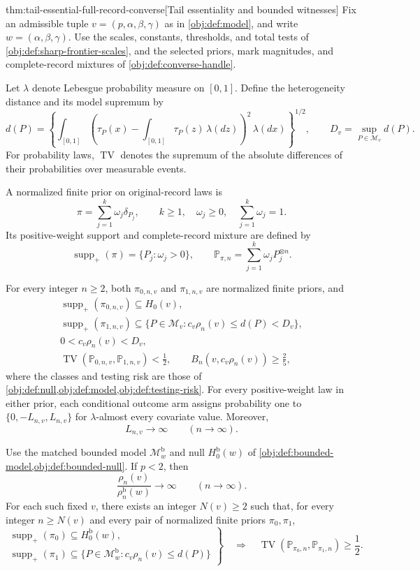 \begin{theoremv}{thm:tail-essential-full-record-converse}[Tail essentiality and bounded witnesses]
Fix an admissible tuple \(v=(p,\alpha,\beta,\gamma)\) as in \cref{obj:def:model}, and write \(w=(\alpha,\beta,\gamma)\). Use the scales, constants, thresholds, and total tests of \cref{obj:def:sharp-frontier-scales}, and the selected priors, mark magnitudes, and complete-record mixtures of \cref{obj:def:converse-handle}.

Let \(\lambda\) denote Lebesgue probability measure on \([0,1]\). Define the heterogeneity distance and its model supremum by
\[
d(P)=
\left\{\int_{[0,1]}
\left(\tau_P(x)-\int_{[0,1]}\tau_P(z)\,\lambda(dz)\right)^2
\,\lambda(dx)\right\}^{1/2},
\qquad
D_v=\sup_{P\in\mathcal M_v}d(P).
\]
For probability laws, \(\operatorname{TV}\) denotes the supremum of the absolute differences of their probabilities over measurable events.

A normalized finite prior on original-record laws is
\[
\pi=\sum_{j=1}^{k}\omega_j\delta_{P_j},
\qquad
k\ge1,\quad \omega_j\ge0,\quad \sum_{j=1}^{k}\omega_j=1.
\]
Its positive-weight support and complete-record mixture are defined by
\[
\operatorname{supp}_+(\pi)=\{P_j:\omega_j>0\},
\qquad
\mathbb P_{\pi,n}=\sum_{j=1}^{k}\omega_jP_j^{\otimes n}.
\]

For every integer \(n\ge2\), both \(\pi_{0,n,v}\) and \(\pi_{1,n,v}\) are normalized finite priors, and
\[
\begin{gathered}
\operatorname{supp}_+(\pi_{0,n,v})\subseteq H_0(v),\\
\operatorname{supp}_+(\pi_{1,n,v})
\subseteq
\{P\in\mathcal M_v:c_v\rho_n(v)\le d(P)<D_v\},\\
0<c_v\rho_n(v)<D_v,\\
\operatorname{TV}(\mathbb P_{0,n,v},\mathbb P_{1,n,v})<\frac12,
\qquad
B_n(v,c_v\rho_n(v))\ge\frac25,
\end{gathered}
\]
where the classes and testing risk are those of
\cref{obj:def:null,obj:def:model,obj:def:testing-risk}.
For every positive-weight law in either prior, each conditional outcome arm assigns probability one to
\(\{0,-L_{n,v},L_{n,v}\}\) for \(\lambda\)-almost every covariate value. Moreover,
\[
L_{n,v}\longrightarrow\infty
\qquad(n\longrightarrow\infty).
\]

Use the matched bounded model \(\mathcal M^{\mathrm b}_w\) and null
\(H_0^{\mathrm b}(w)\) of
\cref{obj:def:bounded-model,obj:def:bounded-null}.
If \(p<2\), then
\[
\frac{\rho_n(v)}{\rho_n^{\mathrm b}(w)}
\longrightarrow\infty
\qquad(n\longrightarrow\infty).
\]
For each such fixed \(v\), there exists an integer \(N(v)\ge2\) such that, for every integer \(n\ge N(v)\) and every pair of normalized finite priors \(\pi_0,\pi_1\),
\[
\left.
\begin{gathered}
\operatorname{supp}_+(\pi_0)\subseteq H_0^{\mathrm b}(w),\\
\operatorname{supp}_+(\pi_1)\subseteq
\{P\in\mathcal M^{\mathrm b}_w:c_v\rho_n(v)\le d(P)\}
\end{gathered}
\right\}
\quad\Longrightarrow\quad
\operatorname{TV}(\mathbb P_{\pi_0,n},\mathbb P_{\pi_1,n})
\ge\frac12.
\]


\end{theoremv}
